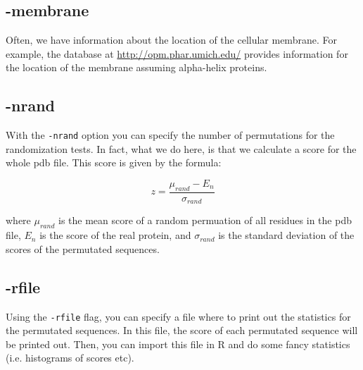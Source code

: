 \subsection*{-membrane}
Often, we have information about the location of the cellular membrane. For example, the database at \url{http://opm.phar.umich.edu/} provides information for the location of the membrane assuming alpha-helix proteins. 


\subsection*{-nrand}
With the \verb!-nrand! option you can specify the number of permutations for the randomization tests. In fact, what we do here, is that we calculate a score for the whole pdb file. This score is given by the formula:

\begin{equation}
z = \frac{\mu_{rand} - E_n}{\sigma_{rand}}
\end{equation}

where $\mu_{rand}$ is the mean score of a random permuation of all residues in the pdb file, $E_n$ is the score of the real protein, and $\sigma_{rand}$ is the standard deviation of the scores of the permutated sequences. 

\subsection*{-rfile}
Using the \verb!-rfile! flag, you can specify a file where to print out the statistics for the permutated sequences. In this file, the score of each permutated sequence will be printed out. Then, you can import this file in R and do some fancy statistics (i.e. histograms of scores etc). 
